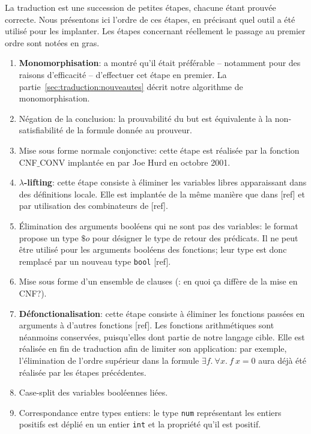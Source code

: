 La traduction est une succession de petites étapes, chacune étant
prouvée correcte. Nous présentons ici l'ordre de ces étapes, en
précisant quel outil a été utilisé pour les implanter. Les étapes
concernant réellement le passage au premier ordre sont notées en gras.
\begin{enumerate}
\item \textbf{Monomorphisation}: \cite{MengP08} a montré qu'il était
  préférable -- notamment pour des raisons d'efficacité -- d'effectuer
  cet étape en premier. La
  partie~\ref{sec:traduction:nouveautes} décrit notre
  algorithme de monomorphisation.
  \item Négation de la conclusion: la prouvabilité du but est
    équivalente à la non-satisfiabilité de la formule donnée au
    prouveur.
  \item Mise sous forme normale conjonctive: cette étape est réalisée
    par la fonction \textsf{CNF$\_$CONV} implantée en \holfour par Joe
    Hurd en octobre 2001.
  \item \textbf{$\lambda$-lifting}: cette étape consiste à éliminer les
    variables libres apparaissant dans des définitions locale. Elle est
    implantée de la même manière que dans [\todo ref] et par utilisation
    des combinateurs de [\todo ref].
  \item Élimination des arguments booléens qui ne sont pas des
    variables: le format \tff propose un type $\$o$ pour désigner le
    type de retour des prédicats. Il ne peut être utilisé pour les
    arguments booléens des fonctions; leur type est donc remplacé par un
    nouveau type \verb!bool! [\todo ref].
  \item Mise sous forme d'un ensemble de clauses (\todo : en quoi ça
    diffère de la mise en CNF?).
  \item \textbf{Défonctionalisation}: cette étape consiste à éliminer
    les fonctions passées en arguments à d'autres fonctions [\todo ref].
    Les fonctions arithmétiques sont néanmoins conservées, puisqu'elles
    dont partie de notre langage cible. Elle est réalisée en fin de
    traduction afin de limiter son application: par exemple,
    l'élimination de l'ordre supérieur dans la formule $\exists f.\
    \forall x.\ f\ x = 0$ aura déjà été réalisée par les étapes
    précédentes.
  \item Case-split des variables booléennes liées.
  \item Correspondance entre types entiers: le type \holfour \verb!num!
    représentant les entiers positifs est déplié en un entier \verb!int!
    et la propriété qu'il est positif.
\end{enumerate}

